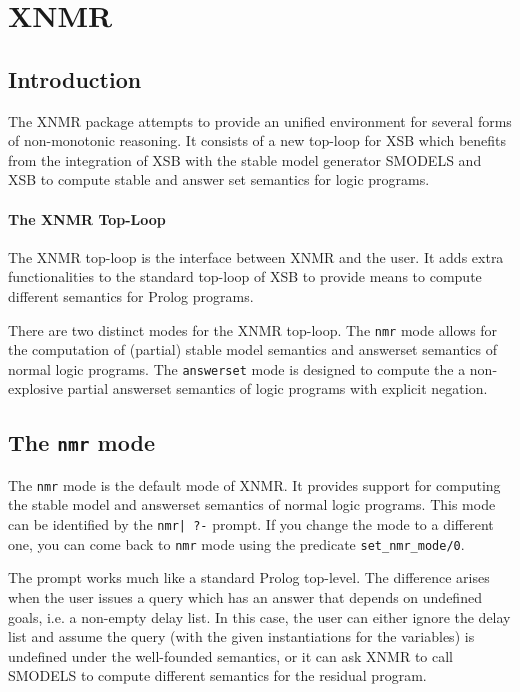 
\section{XNMR}

\subsection{Introduction}

The XNMR package attempts to provide an unified environment for
several forms of non-monotonic reasoning. It consists of a new
top-loop for XSB which benefits from the integration of XSB with the
stable model generator SMODELS \cite{smodels} and XSB to compute
stable and answer set semantics for logic programs.

\paragraph*{The XNMR Top-Loop}

The XNMR top-loop is the interface between XNMR and the user. It adds
extra functionalities to the standard top-loop of XSB to provide means
to compute different semantics  for Prolog programs.

There are two distinct modes for the XNMR top-loop. The \texttt{nmr}
mode allows for the computation of (partial) stable model semantics
and answerset semantics of normal logic programs. The
\texttt{answerset} mode is designed to compute the a non-explosive
partial answerset semantics of logic programs with explicit negation.

\subsection{The \texttt{nmr} mode}

The \texttt{nmr} mode is the default mode of XNMR. It provides support
for computing the stable model and answerset semantics of normal logic
programs. This mode can be identified by the \verb#nmr| ?-# prompt. If
you change the mode to a different one, you can come back to
\texttt{nmr} mode using the predicate \texttt{set\_nmr\_mode/0}.

The prompt works much like a standard Prolog top-level. The difference
arises when the user issues a query which has an answer that depends
on undefined goals, i.e. a non-empty delay list. In this case, the
user can either ignore the delay list and assume the query (with the
given instantiations for the variables) is undefined under the
well-founded semantics, or it can ask XNMR to call SMODELS to compute
different semantics for the residual program.

